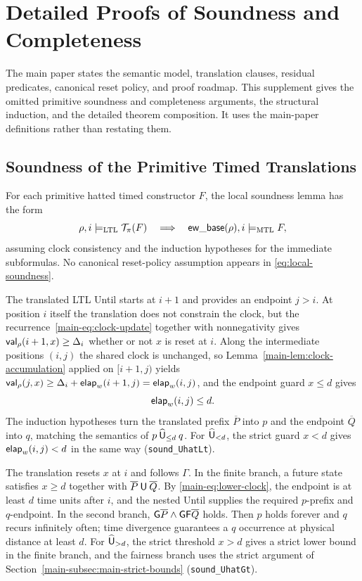 \section{Detailed Proofs of Soundness and Completeness}
\label{sec:supp-proof}
The main paper states the semantic model, translation clauses, residual predicates, canonical reset policy, and proof roadmap. This supplement gives the omitted primitive soundness and completeness arguments, the structural induction, and the detailed theorem composition. It uses the main-paper definitions rather than restating them.

\subsection{Soundness of the Primitive Timed Translations}
\label{subsec:timed-soundness}

For each primitive hatted timed constructor $F$, the local soundness lemma has
the form
\begin{equation}
  \rho,i\models_{\mathrm{LTL}} \mathcal{T}_\pi(F)
  \quad\Longrightarrow\quad
  \mathsf{ew\_base}(\rho),i\models_{\mathrm{MTL}} F,
\label{eq:local-soundness}
\end{equation}
assuming clock consistency and the induction hypotheses for the immediate
subformulas.  No canonical reset-policy assumption appears in
\eqref{eq:local-soundness}.

The translated LTL Until starts at $i+1$ and provides an endpoint $j>i$.
At position $i$ itself the translation does not constrain the clock, but the
recurrence~\eqref{main-eq:clock-update} together with nonnegativity gives
$\mathsf{val}_\rho(i+1,x)\ge\Delta_i$ whether or not $x$ is reset at $i$.  Along the
intermediate positions $(i,j)$ the shared clock is unchanged, so
Lemma~\ref{main-lem:clock-accumulation} applied on $[i+1,j)$ yields
$\mathsf{val}_\rho(j,x)\ge\Delta_i+\mathsf{elap}_w(i+1,j)=\mathsf{elap}_w(i,j)$, and the
endpoint guard $x\le d$ gives
\[
  \mathsf{elap}_w(i,j)\le d.
\]
The induction hypotheses turn the translated prefix $\overline{P}$ into $p$ and the
endpoint $\overline{Q}$ into $q$, matching the semantics of
$p\mathbin{\widehat{\mathsf{U}}}_{\le d}q$.  For $\mathbin{\widehat{\mathsf{U}}}_{<d}$, the strict guard $x<d$ gives
$\mathsf{elap}_w(i,j)<d$ in the same way (\texttt{sound\_\allowbreak{}UhatLt}).

The translation resets $x$ at $i$ and follows $\Gamma$.  In the finite branch,
a future state satisfies $x\ge d$ together with $\overline{P}\mathbin{\mathsf{U}} \overline{Q}$.  By
\eqref{main-eq:lower-clock}, the endpoint is at least $d$ time units after $i$, and
the nested Until supplies the required $p$-prefix and $q$-endpoint.  In the
second branch, $\mathsf{G} \overline{P}\land\mathsf{G}\mathsf{F} \overline{Q}$ holds.  Then $p$ holds
forever and $q$ recurs infinitely often; time divergence guarantees a $q$
occurrence at physical distance at least $d$.  For $\mathbin{\widehat{\mathsf{U}}}_{>d}$, the strict
threshold $x>d$ gives a strict lower bound in the finite branch, and the
fairness branch uses the strict argument of Section~\ref{main-subsec:main-strict-bounds}
(\texttt{sound\_\allowbreak{}UhatGt}).

